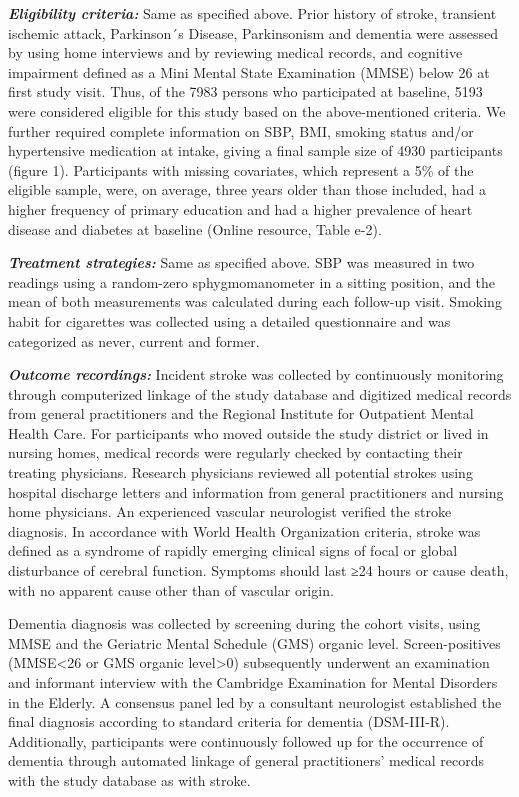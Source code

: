 \documentclass[
]{book}
\begin{document}
\textbf{\emph{Eligibility criteria:}} Same as specified above. Prior history of stroke, transient ischemic attack, Parkinson´s Disease, Parkinsonism and dementia were assessed by using home interviews and by reviewing medical records, and cognitive impairment defined as a Mini Mental State Examination (MMSE) below 26 at first study visit. Thus, of the 7983 persons who participated at baseline, 5193 were considered eligible for this study based on the above-mentioned criteria. We further required complete information on SBP, BMI, smoking status and/or hypertensive medication at intake, giving a final sample size of 4930 participants (figure 1). Participants with missing covariates, which represent a 5\% of the eligible sample, were, on average, three years older than those included, had a higher frequency of primary education and had a higher prevalence of heart disease and diabetes at baseline (Online resource, Table e-2).

\textbf{\emph{Treatment strategies:}} Same as specified above. SBP was measured in two readings using a random-zero sphygmomanometer in a sitting position, and the mean of both measurements was calculated during each follow-up visit. Smoking habit for cigarettes was collected using a detailed questionnaire and was categorized as never, current and former.

\textbf{\emph{Outcome recordings:}} Incident stroke was collected by continuously monitoring through computerized linkage of the study database and digitized medical records from general practitioners and the Regional Institute for Outpatient Mental Health Care. For participants who moved outside the study district or lived in nursing homes, medical records were regularly checked by contacting their treating physicians. Research physicians reviewed all potential strokes using hospital discharge letters and information from general practitioners and nursing home physicians. An experienced vascular neurologist verified the stroke diagnosis\autocite{wieberdink2012,akoudad2015}. In accordance with World Health Organization criteria, stroke was defined as a syndrome of rapidly emerging clinical signs of focal or global disturbance of cerebral function. Symptoms should last ≥24 hours or cause death, with no apparent cause other than of vascular origin.

Dementia diagnosis was collected by screening during the cohort visits, using MMSE and the Geriatric Mental Schedule (GMS) organic level. Screen-positives (MMSE\textless26 or GMS organic level\textgreater0) subsequently underwent an examination and informant interview with the Cambridge Examination for Mental Disorders in the Elderly. A consensus panel led by a consultant neurologist established the final diagnosis according to standard criteria for dementia (DSM-III-R). Additionally, participants were continuously followed up for the occurrence of dementia through automated linkage of general practitioners' medical records with the study database\autocite{debruijn2015,ott1999} as with stroke.
\end{document}
